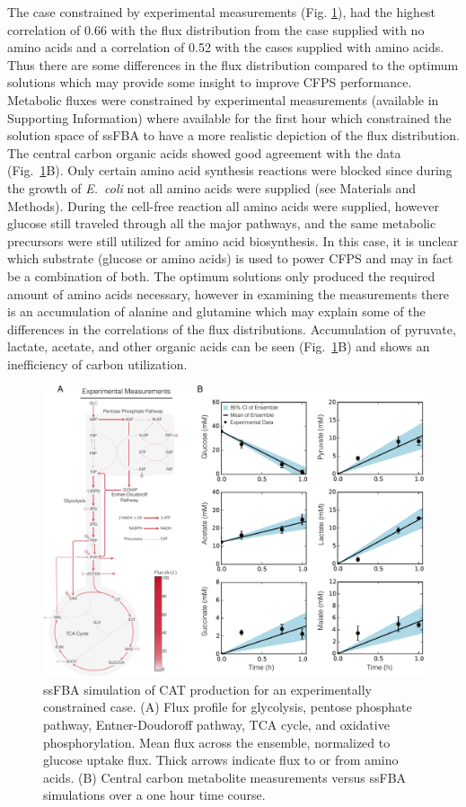 \documentclass[journal=asbcd6,manuscript=article]{achemso}
\begin{document}
The case constrained by experimental measurements (Fig. \ref{fig:flux_exp}), had the highest correlation of 0.66 with the flux distribution from the case supplied with no amino acids and a correlation of 0.52 with the cases supplied with amino acids.
Thus there are some differences in the flux distribution compared to the optimum solutions which may provide some insight to improve CFPS performance.
Metabolic fluxes were constrained by experimental measurements (available in Supporting Information) where available for the first hour which constrained the solution space of ssFBA to have a more realistic depiction of the flux distribution.
The central carbon organic acids showed good agreement with the data (Fig.~\ref{fig:flux_exp}B).
Only certain amino acid synthesis reactions were blocked since during the growth of \emph{E.~coli} not all amino acids were supplied (see Materials and Methods).
During the cell-free reaction all amino acids were supplied, however glucose still traveled through all the major pathways, and the same metabolic precursors were still utilized for amino acid biosynthesis.
In this case, it is unclear which substrate (glucose or amino acids) is used to power CFPS and may in fact be a combination of both.
The optimum solutions only produced the required amount of amino acids necessary, however in examining the measurements there is an accumulation of alanine and glutamine which may explain some of the differences in the correlations of the flux distributions.
Accumulation of pyruvate, lactate, acetate, and other organic acids can be seen (Fig.~\ref{fig:flux_exp}B) and shows an inefficiency of carbon utilization.
\begin{figure}[t!]
\includegraphics[width=1.00\textwidth]{./figs/Fig-6-FluxDistribition-Experimental.pdf}
\caption{ssFBA simulation of CAT production for an experimentally constrained case. (A) Flux profile for glycolysis, pentose phosphate pathway, Entner-Doudoroff pathway, TCA cycle, and oxidative phosphorylation.  Mean flux across the ensemble, normalized to glucose uptake flux. Thick arrows indicate flux to or from amino acids. (B) Central carbon metabolite measurements versus ssFBA simulations over a one hour time course.}
\label{fig:flux_exp}
\end{figure}
\end{document}
